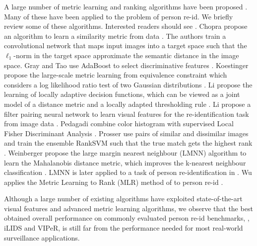 \documentclass[10pt,twocolumn,letterpaper]{article}
\begin{document}
A large number of metric learning and ranking algorithms
have been proposed \cite{Chopra2005Learning,Davis2007Information,
Frome2007Learning,Kedem2012Nonlinear,Kostinger2012Large,Weinberger2006Distance,
Weinberger2008Fast,Wu2011Optimizing,Xiong2014Person}.
Many of these have been applied to the problem of
person re-id.
We briefly review some of these algorithms.
Interested readers should see \cite{Yang2006Distance}.
%
Chopra \etal propose an algorithm to learn a similarity metric
from data \cite{Chopra2005Learning}.
The authors train a convolutional network that maps input images into a target
space such that the $\ell_1$-norm in the target space approximate
the semantic distance in the image space.
%
%
%
%
%
%
Gray and Tao use AdaBoost to select discriminative features \cite{Gray2008Viewpoint}.
%
Koestinger \etal propose the large-scale metric learning
from equivalence constraint
which considers a log likelihood ratio test of two
Gaussian distributions \cite{Kostinger2012Large}.
%
%
Li \etal propose the learning of locally adaptive decision functions,
which can be viewed as a joint model of a distance metric
and a locally adapted thresholding rule \cite{Li2013Learning}.
%
Li \etal propose a filter pairing neural network to learn
visual features for the re-identification task from image data \cite{Li2014Deep}.
%
Pedagadi \etal combine color histogram with supervised
Local Fisher Discriminant Analysis \cite{Pedagadi2013Local}.
%
Prosser \etal use pairs of similar and dissimilar images and train the ensemble RankSVM
such that the true match gets the highest rank \cite{Prosser2010Person}.
%
Weinberger \etal propose the large margin nearest neighbour (LMNN) algorithm to learn the
Mahalanobis distance metric, which improves the k-nearest neighbour classification
\cite{Weinberger2006Distance}.
LMNN is later applied to a task of person re-identification in \cite{Hirzer2012Person}.
%
%
%
%
%
%
Wu \etal applies the Metric Learning to Rank (MLR) method of \cite{McFee2010Metric} to person
re-id \cite{Wu2011Optimizing}.


Although a large number of existing algorithms have
exploited state-of-the-art visual features and
advanced metric learning algorithms,
we observe that the best obtained overall performance on
commonly evaluated person re-id benchmarks, \eg, iLIDS and VIPeR,
is still far from the performance needed for most real-world
surveillance applications.
%
%
%
\end{document}
